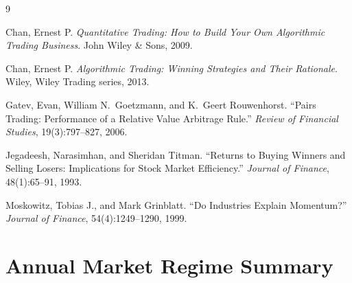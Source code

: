 \documentclass{article}
\begin{document}
\begin{thebibliography}{9}

Chan, Ernest P.
\textit{Quantitative Trading: How to Build Your Own Algorithmic Trading Business}.
John Wiley \& Sons, 2009.

Chan, Ernest P.
\textit{Algorithmic Trading: Winning Strategies and Their Rationale}.
Wiley, Wiley Trading series, 2013.

Gatev, Evan, William N.\ Goetzmann, and K.\ Geert Rouwenhorst.
``Pairs Trading: Performance of a Relative Value Arbitrage Rule.''
\textit{Review of Financial Studies}, 19(3):797--827, 2006.

Jegadeesh, Narasimhan, and Sheridan Titman.
``Returns to Buying Winners and Selling Losers: Implications for Stock Market Efficiency.''
\textit{Journal of Finance}, 48(1):65--91, 1993.

Moskowitz, Tobias J., and Mark Grinblatt.
``Do Industries Explain Momentum?''
\textit{Journal of Finance}, 54(4):1249--1290, 1999.

\end{thebibliography}

\appendix

\section{Annual Market Regime Summary}
\end{document}

